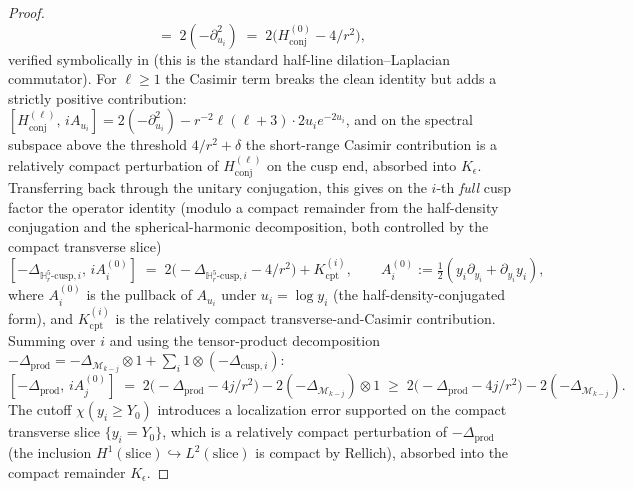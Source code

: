\documentclass[11pt,letterpaper]{article}
\theoremstyle{definition}
\newcommand{\bbH}{\mathbb{H}}
\newcommand{\cM}{\mathcal{M}}
\newcommand{\Lap}{\Delta}
\begin{document}
\begin{proof}
\begin{equation}
[H_{\mathrm{conj}}^{(0)},\, iA_{u_i}] \;=\; 2(-\partial_{u_i}^2) \;=\; 2\bigl(H_{\mathrm{conj}}^{(0)} - 4/r^2\bigr),
\end{equation}
verified symbolically in \cite{mourre-cusp-script} (this is the standard half-line dilation--Laplacian commutator). For $\ell\ge 1$ the Casimir term breaks the clean identity but adds a strictly positive contribution: $[H_{\mathrm{conj}}^{(\ell)},\, iA_{u_i}] = 2(-\partial_{u_i}^2) - r^{-2}\ell(\ell+3)\cdot 2u_i e^{-2u_i}$, and on the spectral subspace above the threshold $4/r^2 + \delta$ the short-range Casimir contribution is a relatively compact perturbation of $H_{\mathrm{conj}}^{(\ell)}$ on the cusp end, absorbed into $K_\epsilon$. Transferring back through the unitary conjugation, this gives on the $i$-th \emph{full} cusp factor the operator identity (modulo a compact remainder from the half-density conjugation and the spherical-harmonic decomposition, both controlled by the compact transverse slice)
\begin{equation}\label{eq:cusp-mourre}
[-\Lap_{\bbH^5_r\text{-cusp},i},\,iA_i^{(0)}] \;=\; 2\bigl(-\Lap_{\bbH^5_r\text{-cusp},i} - 4/r^2\bigr) + K^{(i)}_{\mathrm{cpt}},\qquad A_i^{(0)} := \tfrac12(y_i\partial_{y_i}+\partial_{y_i}y_i),
\end{equation}
where $A_i^{(0)}$ is the pullback of $A_{u_i}$ under $u_i = \log y_i$ (the half-density-conjugated form), and $K^{(i)}_{\mathrm{cpt}}$ is the relatively compact transverse-and-Casimir contribution. Summing over $i$ and using the tensor-product decomposition $-\Lap_{\mathrm{prod}} = -\Lap_{\cM_{k-j}}\otimes 1 + \sum_i 1\otimes(-\Lap_{\text{cusp},i})$:
\begin{equation}\label{eq:prod-mourre}
[-\Lap_{\mathrm{prod}},\,iA_j^{(0)}] \;=\; 2\bigl(-\Lap_{\mathrm{prod}} - 4j/r^2\bigr) - 2(-\Lap_{\cM_{k-j}})\otimes 1\;\ge\;2\bigl(-\Lap_{\mathrm{prod}} - 4j/r^2\bigr) - 2(-\Lap_{\cM_{k-j}}).
\end{equation}
The cutoff $\chi(y_i\ge Y_0)$ introduces a localization error supported on the compact transverse slice $\{y_i = Y_0\}$, which is a relatively compact perturbation of $-\Lap_{\mathrm{prod}}$ (the inclusion $H^1(\text{slice})\hookrightarrow L^2(\text{slice})$ is compact by Rellich), absorbed into the compact remainder $K_\epsilon$.


\end{proof}
\end{document}
